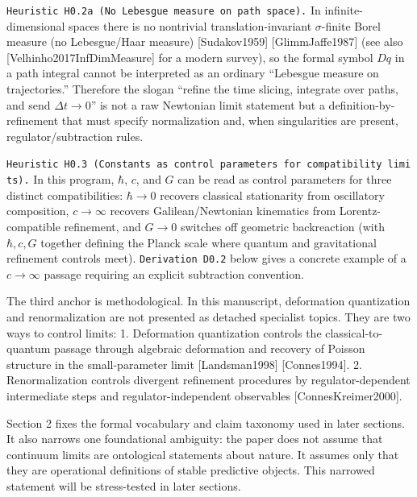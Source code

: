 \documentclass[
]{article}
\begin{document}
\texttt{Heuristic\ H0.2a\ (No\ Lebesgue\ measure\ on\ path\ space).} In
infinite-dimensional spaces there is no nontrivial translation-invariant
\(\sigma\)-finite Borel measure (no Lebesgue/Haar measure)
{[}Sudakov1959{]} {[}GlimmJaffe1987{]} (see also
{[}Velhinho2017InfDimMeasure{]} for a modern survey), so the formal
symbol \(Dq\) in a path integral cannot be interpreted as an ordinary
``Lebesgue measure on trajectories.'' Therefore the slogan ``refine the
time slicing, integrate over paths, and send \(\Delta t\to0\)'' is not a
raw Newtonian limit statement but a definition-by-refinement that must
specify normalization and, when singularities are present,
regulator/subtraction rules.

\texttt{Heuristic\ H0.3\ (Constants\ as\ control\ parameters\ for\ compatibility\ limits).}
In this program, \(\hbar\), \(c\), and \(G\) can be read as control
parameters for three distinct compatibilities: \(\hbar\to0\) recovers
classical stationarity from oscillatory composition, \(c\to\infty\)
recovers Galilean/Newtonian kinematics from Lorentz-compatible
refinement, and \(G\to0\) switches off geometric backreaction (with
\(\hbar,c,G\) together defining the Planck scale where quantum and
gravitational refinement controls meet). \texttt{Derivation\ D0.2} below
gives a concrete example of a \(c\to\infty\) passage requiring an
explicit subtraction convention.

The third anchor is methodological. In this manuscript, deformation
quantization and renormalization are not presented as detached
specialist topics. They are two ways to control limits: 1. Deformation
quantization controls the classical-to-quantum passage through algebraic
deformation and recovery of Poisson structure in the small-parameter
limit {[}Landsman1998{]} {[}Connes1994{]}. 2. Renormalization controls
divergent refinement procedures by regulator-dependent intermediate
steps and regulator-independent observables {[}ConnesKreimer2000{]}.

Section 2 fixes the formal vocabulary and claim taxonomy used in later
sections. It also narrows one foundational ambiguity: the paper does not
assume that continuum limits are ontological statements about nature. It
assumes only that they are operational definitions of stable predictive
objects. This narrowed statement will be stress-tested in later
sections.
\end{document}

